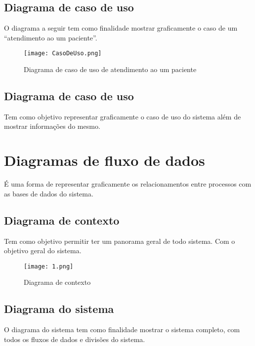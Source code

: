     \subsection{ Diagrama de caso de uso}
    O diagrama a seguir tem como finalidade mostrar graficamente o caso de um “atendimento ao um paciente”.
    \begin{figure}[H]
              \begin{center}
                  \caption{ Diagrama de caso de uso de atendimento ao um paciente} \label{afp}
                  \texttt{[image: CasoDeUso.png]} \\

              \end{center}
             \end{figure}




    \subsection{ Diagrama de caso de uso}
    Tem como objetivo representar graficamente o caso de uso do sistema além de mostrar informações do mesmo.
\section{ Diagramas de fluxo de dados}
É uma forma de representar graficamente os relacionamentos entre processos com as bases de dados do sistema.

    \subsection{Diagrama de contexto}
    Tem como objetivo permitir ter um panorama geral de todo sistema. Com o objetivo geral do sistema.
    \begin{figure}[H]
              \begin{center}
                  \caption{ Diagrama de contexto} \label{afp}
                  \texttt{[image: 1.png]} \\

              \end{center}
             \end{figure}

    \subsection{Diagrama do sistema }
    O diagrama do sistema tem como finalidade mostrar o sistema completo, com todos os fluxos de dados e divisões do sistema.

